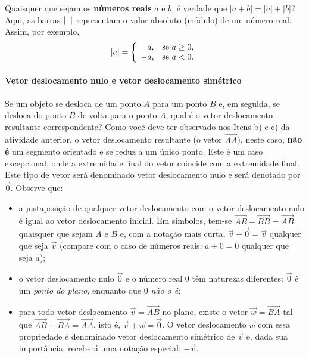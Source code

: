 \begin{reflection}

Quaisquer que sejam os \textbf{números reais} \(a\) e \(b\), é verdade que \(|a + b| = |a| + |b|\)? Aqui, as barras \(|\hphantom{x}|\) representam o valor absoluto (módulo) de um número real. Assim, por exemplo,
\begin{equation*}
\begin{split}|a| = \left\{\begin{array}{ll}
                  \hphantom{+}a, & \text{se } a \geq 0, \\
                  -a, & \text{se } a < 0.
      \end{array}\right.\end{split}
\end{equation*}\end{reflection}

\paragraph{Vetor deslocamento nulo e vetor deslocamento simétrico}

Se um objeto se desloca de um ponto \(A\) para um ponto \(B\) e, em seguida, se desloca do ponto \(B\) de volta para o ponto \(A\), qual é o vetor deslocamento resultante correspondente? Como você deve ter observado nos Itens b) e c) da atividade anterior, o vetor deslocamento resultante (o vetor \(\overrightarrow{AA}\)), neste caso, \textbf{não é} um segmento orientado e se reduz a um único ponto. Este é um caso excepcional, onde a extremidade final do vetor coincide com a extremidade final. Este tipo de vetor será denominado vetor deslocamento nulo e será denotado por \(\vec{0}\). Observe que:
\begin{itemize}
\item {} 
a justaposição de qualquer vetor deslocamento com o vetor deslocamento nulo é igual ao vetor deslocamento inicial. Em símbolos, tem-se \(\overrightarrow{AB} + \overrightarrow{BB} = \overrightarrow{AB}\) quaisquer que sejam \(A\) e \(B\) e, com a notação mais curta, \(\vec{v} + \vec{0} = \vec{v}\) qualquer que seja \(\vec{v}\) (compare com o caso de  números reais: \(a + 0 = 0\) qualquer que seja \(a\));

\item {} 
o vetor deslocamento nulo \(\vec{0}\) e o número real \(0\) têm naturezas diferentes: \(\vec{0}\) é um \textit{ponto do plano}, enquanto que \(0\) \textit{não o é};

\item {} 
para todo vetor deslocamento \(\vec{v} = \overrightarrow{AB}\) no plano, existe o vetor \(\vec{w} = \overrightarrow{BA}\) tal que \(\overrightarrow{AB} + \overrightarrow{BA} = \overrightarrow{AA}\), isto é, \(\vec{v} + \vec{w} = \vec{0}\). O vetor deslocamento \(\vec{w}\) com essa propriedade é denominado vetor deslocamento simétrico de \(\vec{v}\) e, dada sua importância, receberá uma notação especial: \(-\vec{v}\).

\end{itemize}


